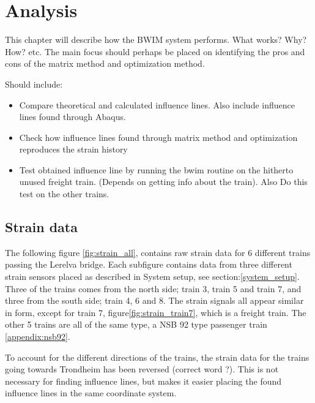 \section{Analysis}

This chapter will describe how the BWIM system performs. What works? Why? How? etc.
The main focus should perhaps be placed on identifying the pros and cons of the matrix method and optimization method.

Should include:
\begin{itemize}
\item Compare theoretical and calculated influence lines. Also include influence lines found through Abaqus.
\item Check how influence lines found through matrix method and optimization reproduces the strain history
\item Test obtained influence line by running the bwim routine on the hitherto unused freight train. (Depends on getting info about the train). Also Do this test on the other trains.
\end{itemize}

\subsection{Strain data}
The following figure \ref{fig:strain_all}, contains raw strain data for 6 different trains passing the Lerelva bridge. Each subfigure contains data from three different strain sensors placed as described in System setup, see section:\ref{system_setup}. Three of the trains comes from the north side; train 3, train 5 and train 7, and three from the south side; train 4, 6 and 8. The strain signals all appear similar in form, except for train 7, figure\ref{fig:strain_train7}, which is a freight train. The other 5 trains are all of the same type, a NSB 92 type passenger train \ref{appendix:nsb92}.


To account for the different directions of the trains, the strain data for the trains going towards Trondheim has been reversed (correct word ?). This is not necessary for finding influence lines, but makes it easier placing the found influence lines in the same coordinate system.

